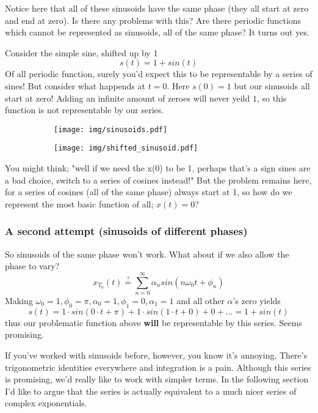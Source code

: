 \documentclass{article}
\newcommand{\0}{{\mathbf{0}}}
\newcommand{\texteq}[1]{\ensuremath{\stackrel{\text{#1}}{=}}}
\begin{document}
Notice here that all of these sinusoids have the same phase (they all start at zero and end at zero).
Is there any problems with this? Are there periodic functions which cannot be represented as sinusoids, all of
the same phase? It turns out yes.

Consider the simple sine, shifted up by 1
$$s(t) = 1+sin(t)$$
Of all periodic function, surely you'd expect this to be
representable by a series of sines! But consider what happends at $t=0$. Here $s(0) = 1$ but our sinusoids all start at zero!
Adding an infinite amount of zeroes will never yeild $1$, so this function is not representable
by our series.

\begin{figure}[h!]
  \centering
  \begin{subfigure}[b]{0.4\textwidth}
    \texttt{[image: img/sinusoids.pdf]}
  \end{subfigure}%
  \begin{subfigure}[b]{0.4\textwidth}
    \texttt{[image: img/shifted\_sinusoid.pdf]}
  \end{subfigure}
\end{figure}

You might think; "well if we need the x(0) to be 1, perhaps that's a sign sines are a bad choice, switch to a series of cosines instead!"
But the problem remains here, for a series of cosines (all of the same phase) always start at 1, so how do we represent the most basic
function of all; $x(t) = 0$?

\subsubsection{A second attempt (sinusoids of different phases)}
So sinusoids of the same phase won't work. What about if we also allow the phase to vary?
$$ x_{T_0}(t) \texteq{?} \sum^{\infty}_{n = 0} \alpha_n sin(n \omega_0 t + \phi_n) $$
Making $\omega_0=1, \phi_0 = \pi, \alpha_0 = 1, \phi_1 = 0, \alpha_1 = 1$ and all other $\alpha$'s zero
yields
$$ s(t) = 1\cdot sin(0\cdot t + \pi) + 1\cdot sin(1\cdot t + 0) + 0 + \dots  = 1 + sin(t)$$
thus our problematic function above \textbf{will} be representable by this series. Seems promising.

If you've worked with sinusoids before, however, you know it's annoying. There's trigonometric identities everywhere and integration is a pain.
Although this series is promising, we'd really like to work with simpler terms.
In the following section I'd like to argue that the series is actually equivalent to a much nicer series of
complex exponentials.
\end{document}
